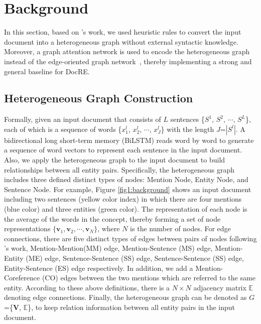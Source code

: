 \documentclass[letterpaper]{article} \usepackage{aaai21}  \usepackage{times}  \usepackage{helvet} \usepackage{courier}  \usepackage[hyphens]{url}  \usepackage{graphicx} \urlstyle{rm} \def\UrlFont{\rm}  \usepackage{natbib}  \usepackage{caption} \frenchspacing  \setlength{\pdfpagewidth}{8.5in}  \setlength{\pdfpageheight}{11in}  \usepackage{amsmath}
\begin{document}
\section{Background}


In this section, based on \cite{Christopoulou2019ConnectingTD}'s work, we used heuristic rules to convert the input document into a heterogeneous graph without external syntactic knowledge.
Moreover, a graph attention network is used to encode the heterogeneous graph instead of the edge-oriented graph network~\cite{Christopoulou2019ConnectingTD}, thereby implementing a strong and general baseline for DocRE.

\subsection{Heterogeneous Graph Construction}
Formally, given an input document that consists of $L$ sentences \{$S^1$, $S^2$, $\cdots$, $S^L$\}, each of which is a sequence of words \{$x^{l}_{1}$, $x^{l}_{2}$, $\cdots$, $x^{l}_{J}$\} with the length $J$=$|S^l|$. 
A bidirectional long short-term memory (BiLSTM) reads word by word to generate a sequence of word vectors to represent each sentence in the input document.
Also, we apply the heterogeneous graph \cite{Christopoulou2019ConnectingTD} to the input document to build relationships between all entity pairs.
Specifically, the heterogeneous graph includes three defined distinct types of nodes: Mention Node, Entity Node, and Sentence Node.
For example, Figure \ref{fig1:background} shows an input document including two sentences (yellow color index) in which there are four mentions (blue color) and three entities (green color).
The representation of each node is the average of the words in the concept, thereby forming a set of node representations $\{\textbf{v}_{1}, \textbf{v}_{2}, \cdots, \textbf{v}_{N}\}$, where $N$ is the number of nodes.
For edge connections, there are five distinct types of edges between pairs of nodes following \cite{Christopoulou2019ConnectingTD}'s work, Mention-Mention(MM) edge, Mention-Sentence (MS) edge, Mention-Entity (ME) edge, Sentence-Sentence (SS) edge, Sentence-Sentence (SS) edge, Entity-Sentence (ES) edge respectively.
In addition, we add a Mention-Coreference (CO) edges between the two mentions which are referred to the same entity.
According to these above definitions, there is a $N\times N$ adjacency matrix $\mathbb{E}$ denoting edge connections.
Finally, the heterogeneous graph can be denoted as $G$=\{$\textbf{V}$, $\mathbb{E}$\}, to keep relation information between all entity pairs in the input document.
\end{document}
